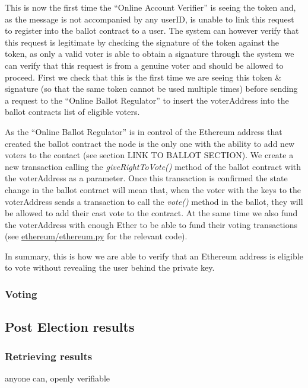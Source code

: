 \documentclass{article}
\begin{document}
This is now the first time the ``Online Account Verifier'' is seeing the token and, as the message is not accompanied by any userID, is unable to link this request to register into the ballot contract to a user. The system can however verify that this request is legitimate by checking the signature of the token against the token, as only a valid voter is able to obtain a signature through the system we can verify that this request is from a genuine voter and should be allowed to proceed. First we check that this is the first time we are seeing this token \& signature (so that the same token cannot be used multiple times) before sending a request to the ``Online Ballot Regulator'' to insert the voterAddress into the ballot contracts list of eligible voters.

As the ``Online Ballot Regulator'' is in control of the Ethereum address that created the ballot contract the node is the only one with the ability to add new voters to the contact (see section {\Large LINK TO BALLOT SECTION}). We create a new transaction calling the \textit{giveRightToVote()} method of the ballot contract with the voterAddress as a parameter. Once this transaction is confirmed the state change in the ballot contract will mean that, when the voter with the keys to the voterAddress sends a transaction to call the \textit{vote()} method in the ballot, they will be allowed to add their cast vote to the contract. At the same time we also fund the voterAddress with enough Ether to be able to fund their voting transactions (see \href{https://github.com/Mattie432/Blockchain-Voting-System/blob/master/Programming/4_OnlineBallotRegulator/ethereum/ethereum.py#L145}{ethereum/ethereum.py} for the relevant code).

In summary, this is how we are able to verify that an Ethereum address is eligible to vote without revealing the user behind the private key.

\cleardoublepage
\subsubsection{Voting}

\cleardoublepage
\subsection{Post Election results}
\subsubsection{Retrieving results}
anyone can, openly verifiable


\end{document}
